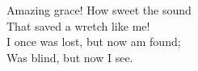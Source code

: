 Amazing grace! How sweet the sound \\
That saved a wretch like me! \\
I once was lost, but now am found; \\
Was blind, but now I see. \\

